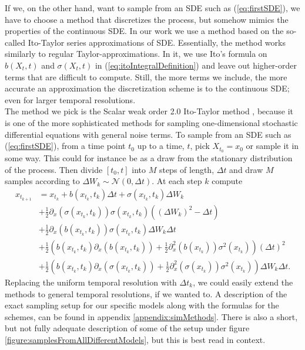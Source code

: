 If we, on the other hand, want to sample from an SDE such as (\ref{eq:firstSDE}), we have to choose a method that discretizes the process, but somehow mimics the properties of the continuous SDE. In our work we use a method based on the so-called Ito-Taylor series approximations of SDE. Essentially, the method works similarly to regular Taylor-approximations. In it, we use Ito's formula on $b(X_t, t)$ and $\sigma(X_t, t)$ in (\ref{eq:itoIntegralDefinition}) and leave out higher-order terms that are difficult to compute. Still, the more terms we include, the more accurate an approximation the discretization scheme is to the continuous SDE; even for larger temporal resolutions.\\
The method we pick is the Scalar weak order 2.0 Ito-Taylor method \cite[Algorithm 8.5]{Srkk2019}, because it is one of the more sophisticated methods for sampling one-dimensional stochastic differential equations with general noise terms. To sample from an SDE such as (\ref{eq:firstSDE}), from a time point $t_0$ up to a time, $t$, pick $X_{t_0} = x_0$ or sample it in some way. This could for instance be as a draw from the stationary distribution of the process. Then divide $[t_0, t]$ into $M$ steps of length, $\Delta t$ and draw $M$ samples according to $\Delta W_k\sim\mathcal{N}\left(0, \Delta t\right)$. At each step $k$ compute
\begin{align}
    x_{t_{k + 1}} &= x_{t_{k}} + b(x_{t_{k}}, t_k)\Delta t + \sigma\left(x_{t_{k}}, t_k\right)\Delta W_k \nonumber \\
    &+ \frac{1}{2}\partial_x \left(\sigma\left(x_{t_{k}}, t_k\right)\right)\sigma\left(x_{t_{k}}, t_k\right)\left(\left(\Delta W_k\right)^2 - \Delta t\right) \nonumber \\
    &+ \frac{1}{2}\partial_x \left(b(x_{t_{k}}, t_k)\right)\sigma(x_{t_{k}}, t_k) \Delta W_k\Delta t \nonumber \\
    &+ \frac{1}{2}\left(b(x_{t_{k}}, t_k)\partial_x\left(b(x_{t_{k}}, t_k)\right) + \frac{1}{2}\partial_x^2\left(b\left(x_{t_k}\right)\right)\sigma^2(x_{t_k})\right)\left(\Delta t\right)^2 \nonumber \\
    &+ \frac{1}{2}\left(b(x_{t_{k}}, t_k)\partial_x \left(\sigma(x_{t_{k}}, t_k)\right) + \frac{1}{2}\partial_x^2\left(\sigma(x_{t_k})\right)\sigma^2(x_{t_k})\right)\Delta W_k\Delta t. \label{eq:weak_2_0_scheme}
\end{align}
Replacing the uniform temporal resolution with $\Delta t_k$, we could easily extend the methods to general temporal resolutions, if we wanted to.
A description of the exact sampling setup for our specific models along with the formulas for the schemes, can be found in appendix \ref{appendix:simMethods}. There is also a short, but not fully adequate description of some of the setup under figure \ref{figure:samplesFromAllDifferentModels}, but this is best read in context.

